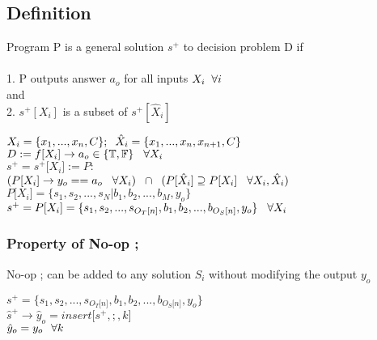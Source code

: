 \documentclass[11pt]{article}
\begin{document}
\subsection{Definition}
Program P is a general solution $s^{+}$ to decision problem D if \\\\
1. P outputs answer $a_o$ for all inputs $X_i \hspace{2mm} \forall i$\\
and \\
2. $s^{+}[X_i]$ is a subset of $s^{+}[\hat{X}_i]$
\begin{center}
\vspace{2mm}
$
X_i = \{x_1,...,x_n,C\}; \hspace{2mm} \hat{X}_i = \{x_1,...,x_n,x_{n+1},C\}
$
\\ \vspace{2mm}
$
D := f \lbrack X_i \rbrack \rightarrow a_{o} \in \{\mathbb{T}, \mathbb{F}\} \hspace{3mm} \forall X_i
$
\\ \vspace{2mm}
$
s^+ = s^+\lbrack X_i \rbrack := P :
$
\\ \vspace{2mm}
$
(P \lbrack X_i \rbrack \rightarrow y_{o} == a_{o} \hspace{3mm} \forall X_i) \hspace{2mm} \cap \hspace{2mm} (P[\hat{X}_i] \supseteq P[X_i] \hspace{3mm} \forall X_i,\hat{X}_i)
$
\\ \vspace{4mm}
$
P \lbrack X_i \rbrack = \{ s_1,s_2,...,s_N| b_1, b_2,...,b_M,y_o\}
$
\\ \vspace{3mm}
$
s^+ = P \lbrack X_i \rbrack = \{ s_1,s_2,...,s_{O_T \lbrack n \rbrack }, b_1, b_2,...,b_{O_S \lbrack n \rbrack},y_o \} \hspace{3mm} \forall X_i
$
\end{center}





\subsubsection{Property of No-op ;}
No-op ; can be added to any solution $S_i$ without modifying the output $y_o$
\begin{center}
$
s^+ = \{ s_1,s_2,...,s_{O_T \lbrack n \rbrack }, b_1, b_2,...,b_{O_S \lbrack n \rbrack},y_o\}
$
\\ \vspace{2mm}
$
\hat{s}^+ \rightarrow \hat{y}_o = insert \lbrack s^+,;,k \rbrack
$
\\ \vspace{2mm}
$
\hat{y}_o = y_o \hspace{2.5mm} \forall k
$
\end{center}
\end{document}
